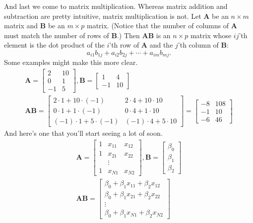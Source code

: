 \documentclass[
  12pt,
  oneside,openany]{book}
\begin{document}
And last we come to matrix multiplication. Whereas matrix addition and subtraction are pretty intuitive, matrix multiplication is not. Let \(\mathbf{A}\) be an \(n \times m\) matrix and \(\mathbf{B}\) be an \(m \times p\) matrix. (Notice that the number of columns of \(\mathbf{A}\) must match the number of rows of \(\mathbf{B}\).) Then \(\mathbf{A} \mathbf{B}\) is an \(n \times p\) matrix whose \(ij\)'th element is the dot product of the \(i\)'th row of \(\mathbf{A}\) and the \(j\)'th column of \(\mathbf{B}\):
\[
a_{i1} b_{1j} + a_{i2} b_{2j} + \cdots + a_{im} b_{mj}.
\]
Some examples might make this more clear.
\[
\begin{gathered}
\mathbf{A} = \begin{bmatrix}
  2 & 10 \\
  0 & 1 \\
  -1 & 5
\end{bmatrix},
\mathbf{B} = \begin{bmatrix}
  1 & 4 \\
  -1 & 10
\end{bmatrix} \\
\mathbf{A} \mathbf{B} = \begin{bmatrix}
  2 \cdot 1 + 10 \cdot (-1) & 2 \cdot 4 + 10 \cdot 10 \\
  0 \cdot 1 + 1 \cdot (-1) & 0 \cdot 4 + 1 \cdot 10 \\
  (-1) \cdot 1 + 5 \cdot (-1) & (-1) \cdot 4 + 5 \cdot 10
\end{bmatrix}
= \begin{bmatrix}
  -8 & 108 \\
  -1 & 10 \\
  -6 & 46
\end{bmatrix}
\end{gathered}
\]
And here's one that you'll start seeing a lot of soon.
\[
\begin{gathered}
\mathbf{A} = \begin{bmatrix}
  1 & x_{11} & x_{12} \\
  1 & x_{21} & x_{22} \\
  & \vdots \\
  1 & x_{N1} & x_{N2}
\end{bmatrix},
\mathbf{B} = \begin{bmatrix}
  \beta_0 \\
  \beta_1 \\
  \beta_2
\end{bmatrix} \\
\mathbf{A} \mathbf{B} = \begin{bmatrix}
  \beta_0 + \beta_1 x_{11} + \beta_2 x_{12} \\
  \beta_0 + \beta_1 x_{21} + \beta_2 x_{22} \\
  \vdots \\
  \beta_0 + \beta_1 x_{N1} + \beta_2 x_{N2}
\end{bmatrix}
\end{gathered}
\]
\end{document}
